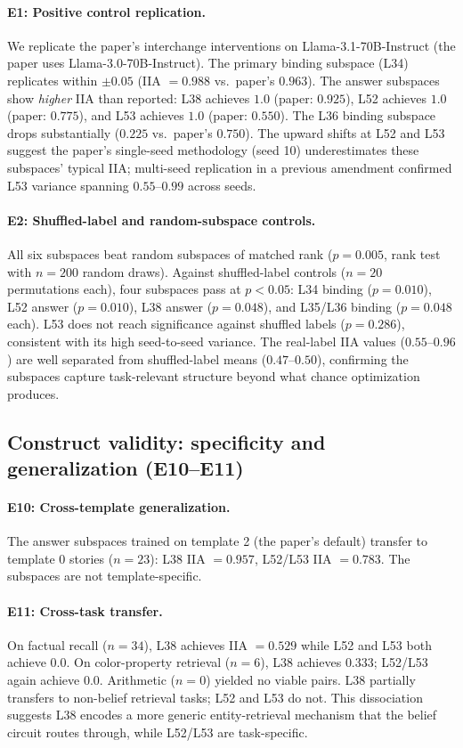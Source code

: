 \documentclass[11pt]{article}
\begin{document}
\paragraph{E1: Positive control replication.}
We replicate the paper's interchange interventions on Llama-3.1-70B-Instruct (the paper uses Llama-3.0-70B-Instruct). The primary binding subspace (L34) replicates within $\pm 0.05$ (IIA $= 0.988$ vs.\ paper's $0.963$). The answer subspaces show \emph{higher} IIA than reported: L38 achieves $1.0$ (paper: $0.925$), L52 achieves $1.0$ (paper: $0.775$), and L53 achieves $1.0$ (paper: $0.550$). The L36 binding subspace drops substantially ($0.225$ vs.\ paper's $0.750$). The upward shifts at L52 and L53 suggest the paper's single-seed methodology (seed 10) underestimates these subspaces' typical IIA; multi-seed replication in a previous amendment confirmed L53 variance spanning $0.55$--$0.99$ across seeds.

\paragraph{E2: Shuffled-label and random-subspace controls.}
All six subspaces beat random subspaces of matched rank ($p = 0.005$, rank test with $n = 200$ random draws). Against shuffled-label controls ($n = 20$ permutations each), four subspaces pass at $p < 0.05$: L34 binding ($p = 0.010$), L52 answer ($p = 0.010$), L38 answer ($p = 0.048$), and L35/L36 binding ($p = 0.048$ each). L53 does not reach significance against shuffled labels ($p = 0.286$), consistent with its high seed-to-seed variance. The real-label IIA values ($0.55$--$0.96$) are well separated from shuffled-label means ($0.47$--$0.50$), confirming the subspaces capture task-relevant structure beyond what chance optimization produces.

\subsection{Construct validity: specificity and generalization (E10--E11)}

\paragraph{E10: Cross-template generalization.}
The answer subspaces trained on template 2 (the paper's default) transfer to template 0 stories ($n = 23$): L38 IIA $= 0.957$, L52/L53 IIA $= 0.783$. The subspaces are not template-specific.

\paragraph{E11: Cross-task transfer.}
On factual recall ($n = 34$), L38 achieves IIA $= 0.529$ while L52 and L53 both achieve $0.0$. On color-property retrieval ($n = 6$), L38 achieves $0.333$; L52/L53 again achieve $0.0$. Arithmetic ($n = 0$) yielded no viable pairs. L38 partially transfers to non-belief retrieval tasks; L52 and L53 do not. This dissociation suggests L38 encodes a more generic entity-retrieval mechanism that the belief circuit routes through, while L52/L53 are task-specific.
\end{document}
